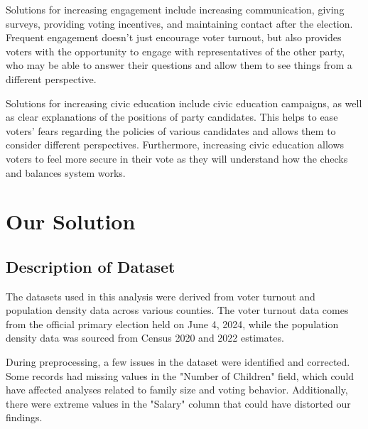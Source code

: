 \documentclass[conference]{IEEEtran}
\begin{document}
Solutions for increasing engagement include increasing communication, giving surveys, providing voting incentives, and maintaining
contact after the election. Frequent engagement doesn't just encourage voter turnout, but also provides voters with the opportunity
to engage with representatives of the other party, who may be able to answer their questions and allow them to see things from a 
different perspective. 

Solutions for increasing civic education include civic education campaigns, as well as clear explanations of the positions of
party candidates. This helps to ease voters' fears regarding the policies of various candidates and allows them to consider different
perspectives. Furthermore, increasing civic education allows voters to feel more secure in their vote as they will understand how the
checks and balances system works.

\section{Our Solution}

\subsection{Description of Dataset}
The datasets used in this analysis were derived from voter turnout and population density data across various counties. The voter turnout data comes from the official primary election held on June 4, 2024, while the population density data was sourced from Census 2020 and 2022 estimates. 

During preprocessing, a few issues in the dataset were identified and corrected. Some records had missing values in the "Number of Children" field, which could have affected analyses related to family size and voting behavior. Additionally, there were extreme values in the "Salary" column that could have distorted our findings.
\end{document}
